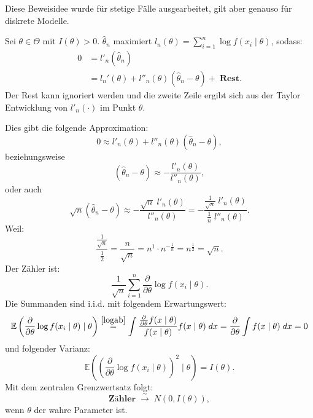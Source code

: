 \documentclass[10pt]{article}
\newcommand{\EW}{\mathbb{E}} %
\newcommand{\KV}{\overset{\sim} \longrightarrow} %
\newcommand{\xt}{x \mid \theta} %
\newcommand{\ablt}{\frac{\partial}{\partial \theta}}
\newenvironment{BWS}[1][]
{\begin{Beweis}[frametitle=#1]}{\end{Beweis}}
\begin{document}
	\begin{BWS}[Beweisidee 1.3.6 (Verteilung des Schätzfehlers)]
		Diese Beweisidee wurde für stetige Fälle ausgearbeitet, gilt aber genauso für diskrete Modelle. 
		
		Sei $\theta \in \Theta$ mit $I(\theta) > 0$. $\hat{\theta}_n$ maximiert $l_n (\theta) = \sum_{i=1}^{n} \log f (x_i \mid \theta)$, sodass:
		\begin{equation*}
			\begin{split}
				0 &= l'_n (\hat{\theta}_n) \\
				&= l_n'(\theta) + l''_n(\theta) (\hat{\theta}_n - \theta) + \; \textbf{Rest}.
			\end{split}
		\end{equation*}
		Der Rest kann ignoriert werden und die zweite Zeile ergibt sich aus der Taylor Entwicklung von $l'_{n}(\cdot)$ im Punkt $\theta$. 
		
		Dies gibt die folgende Approximation:
		\begin{equation*}
			0 \approx l'_n (\theta) +  l''_n(\theta) (\hat{\theta}_n - \theta),
		\end{equation*}
		beziehungsweise
		\begin{equation*}
			(\hat{\theta}_n - \theta) \approx -\frac{l'_n (\theta)}{l''_n(\theta)},
		\end{equation*}
		oder auch
		\begin{equation*}
			\sqrt{n} (\hat{\theta}_n - \theta) \approx -\frac{\sqrt{n}\;l'_n(\theta)}{l''_n(\theta)} = -\frac{\frac{1}{\sqrt{n} } \; l'_n(\theta)}{\frac{1}{n}\;l''_n(\theta)}.
		\end{equation*}
		Weil:
		\begin{equation*}
			\frac{\frac{1}{\sqrt{n}}}{\frac{1}{2}} = \frac{n}{\sqrt{n}} = n^1 \cdot n^{-\frac{1}{n}} = n^{\frac{1}{2}} = \sqrt{n}.
		\end{equation*}
		Der Zähler ist:
		\begin{equation*}
			\frac{1}{\sqrt{n}}\sum_{i=1}^{n} \frac{\partial}{\partial \theta} \log f(x_i \mid \theta).
		\end{equation*}
		Die Summanden sind i.i.d. mit folgendem Erwartungswert:
		\begin{equation*}
			\EW\left(\ablt \log f(x_i \mid \theta) \mid \theta\right) \overset{\ref{logab}}{=} \int \frac{\ablt f(x \mid \theta)}{f(\xt)} f(\xt) \; dx = \ablt \int f(\xt) \; dx = 0
		\end{equation*}
		und folgender Varianz:
		\begin{equation*}
			\EW\left(\left(\ablt \log f(x_i \mid \theta)\right)^2 \mid \theta\right) = I(\theta).
		\end{equation*}
		Mit dem zentralen Grenzwertsatz folgt:
		\begin{equation*}
			\textbf{Zähler} \; \KV \; N(0,I(\theta)),
		\end{equation*}
		wenn $\theta$ der wahre Parameter ist.
		

\end{BWS}
\end{document}
